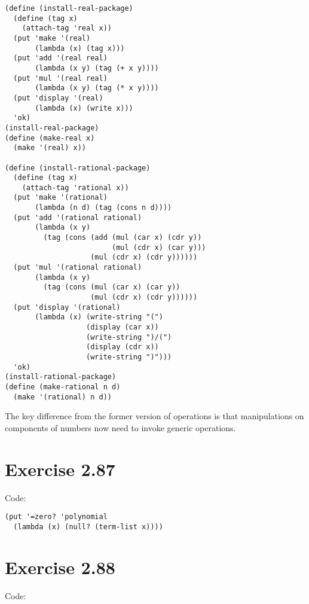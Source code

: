 \documentclass[../main.tex]{subfiles}
\begin{document}
\begin{lstlisting}
(define (install-real-package)
  (define (tag x)
    (attach-tag 'real x))
  (put 'make '(real)
       (lambda (x) (tag x)))
  (put 'add '(real real)
       (lambda (x y) (tag (+ x y))))
  (put 'mul '(real real)
       (lambda (x y) (tag (* x y))))
  (put 'display '(real)
       (lambda (x) (write x)))
  'ok)
(install-real-package)
(define (make-real x)
  (make '(real) x))

(define (install-rational-package)
  (define (tag x)
    (attach-tag 'rational x))
  (put 'make '(rational)
       (lambda (n d) (tag (cons n d))))
  (put 'add '(rational rational)
       (lambda (x y)
         (tag (cons (add (mul (car x) (cdr y))
                         (mul (cdr x) (car y)))
                    (mul (cdr x) (cdr y))))))
  (put 'mul '(rational rational)
       (lambda (x y)
         (tag (cons (mul (car x) (car y))
                    (mul (cdr x) (cdr y))))))
  (put 'display '(rational)
       (lambda (x) (write-string "(")
                   (display (car x))
                   (write-string ")/(")
                   (display (cdr x))
                   (write-string ")")))
  'ok)
(install-rational-package)
(define (make-rational n d)
  (make '(rational) n d))
\end{lstlisting}

The key difference from the former version of operations
 is that manipulations on components of numbers now need
 to invoke generic operations.

\section{Exercise 2.87}

Code:

\begin{lstlisting}
(put '=zero? 'polynomial
  (lambda (x) (null? (term-list x))))
\end{lstlisting}

\section{Exercise 2.88}

Code:
\end{document}
